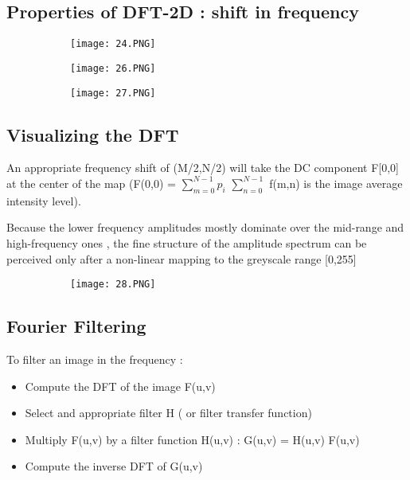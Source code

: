 \documentclass{article}
\begin{document}
\subsection{Properties of DFT-2D : shift in frequency}


 \begin{figure}[ht!]
  \centering
  \begin{subfigure}[b]{0.89\linewidth}
    \texttt{[image: 24.PNG]}
  \end{subfigure}
\end{figure}

 \begin{figure}[ht!]
  \centering
  \begin{subfigure}[b]{0.2\linewidth}
    \texttt{[image: 26.PNG]}
  \end{subfigure}
     \begin{subfigure}[b]{0.79\textwidth}
         \centering
         \texttt{[image: 27.PNG]}
     \end{subfigure}
\end{figure}



\subsection{Visualizing the DFT}

An appropriate frequency shift of (M/2,N/2) will take the DC component F[0,0] at the center of the map (F(0,0) = $\sum\limits_{m=0}^{N-1} p_i$
$\displaystyle\sum_{n=0}^{N-1}$ f(m,n) is the image average intensity level).

Because the lower frequency amplitudes mostly dominate over the mid-range and high-frequency ones , the fine structure of the amplitude spectrum can be perceived only after a non-linear mapping to the greyscale range [0,255]

 \begin{figure}[ht!]
  \centering
  \begin{subfigure}[b]{0.4\linewidth}
    \texttt{[image: 28.PNG]}
  \end{subfigure}
\end{figure}

\subsection{Fourier Filtering}
To filter an image in the frequency : 
\begin{itemize}
    \item Compute the DFT of the image F(u,v)
    \item Select and appropriate filter H ( or filter transfer function)
    \item Multiply F(u,v) by a filter function H(u,v) : G(u,v) = H(u,v) F(u,v)
    \item Compute the inverse DFT of G(u,v)
\end{itemize}
\end{document}

